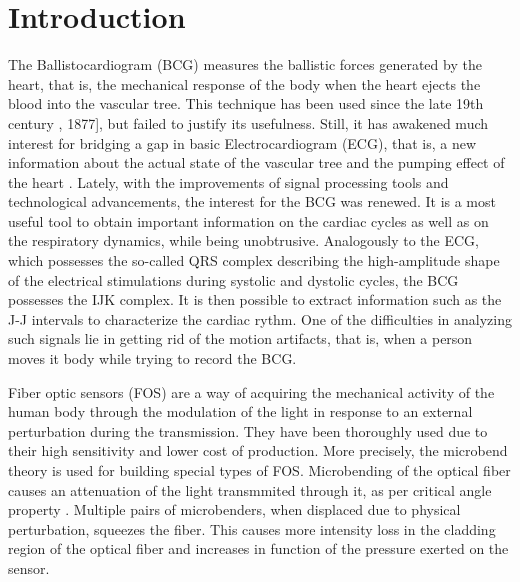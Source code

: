 \documentclass[twoside,twocolumn]{article}
\begin{document}

\section{Introduction}

The Ballistocardiogram (BCG) measures the ballistic forces generated by the heart, that is, the mechanical response of the body when the heart ejects the blood into the vascular tree. This technique has been used since the late 19th century \cite{gordon_certain_1877}, 1877], but failed to justify its usefulness. Still, it has awakened much interest for bridging a gap in basic Electrocardiogram (ECG), that is, a new information about the actual state of the vascular tree and the pumping effect of the heart \cite{singewald_ballistocardiography:_1954}. Lately, with the improvements of signal processing tools and technological advancements, the interest for the BCG was renewed. It is a most useful tool to obtain important information on the cardiac cycles as well as on the respiratory dynamics, while being unobtrusive. Analogously to the ECG, which possesses the so-called QRS complex describing the high-amplitude shape of the electrical stimulations during systolic and dystolic cycles, the BCG possesses the IJK complex. It is then possible to extract information such as the J-J intervals to characterize the cardiac rythm. One of the difficulties in analyzing such signals lie in getting rid of the motion artifacts, that is, when a person moves it body while trying to record the BCG.

Fiber optic sensors (FOS) are a way of acquiring the mechanical activity of the human body through the modulation of the light in response to an external perturbation during the transmission. They have been thoroughly used due to their high sensitivity and lower cost of production. More precisely, the microbend theory is used for building special types of FOS. Microbending of the optical fiber causes an attenuation of the light transmmited through it, as per critical angle property \cite{}. Multiple pairs of microbenders, when displaced due to physical perturbation, squeezes the fiber. This causes more intensity loss in the cladding region of the optical fiber and increases in function of the pressure exerted on the sensor.
\end{document}
